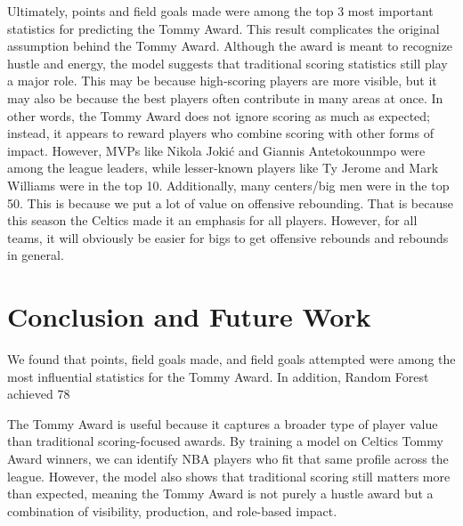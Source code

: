 \documentclass[11pt]{article}
\begin{document}
Ultimately, points and field goals made were among the top 3 most important statistics for predicting the Tommy Award. This result complicates the original assumption behind the Tommy Award. Although the award is meant to recognize hustle and energy, the model suggests that traditional scoring statistics still play a major role. This may be because high-scoring players are more visible, but it may also be because the best players often contribute in many areas at once. In other words, the Tommy Award does not ignore scoring as much as expected; instead, it appears to reward players who combine scoring with other forms of impact. However, MVPs like Nikola Jokić and Giannis Antetokounmpo were among the league leaders, while lesser-known players like Ty Jerome and Mark Williams were in the top 10. Additionally, many centers/big men were in the top 50. This is because we put a lot of value on offensive rebounding. That is because this season the Celtics made it an emphasis for all players. However, for all teams, it will obviously be easier for bigs to get offensive rebounds and rebounds in general.

\section{Conclusion and Future Work}

We found that points, field goals made, and field goals attempted were among the most influential statistics for the Tommy Award. In addition, Random Forest achieved 78%

The Tommy Award is useful because it captures a broader type of player value than traditional scoring-focused awards. By training a model on Celtics Tommy Award winners, we can identify NBA players who fit that same profile across the league. However, the model also shows that traditional scoring still matters more than expected, meaning the Tommy Award is not purely a hustle award but a combination of visibility, production, and role-based impact.
\end{document}
